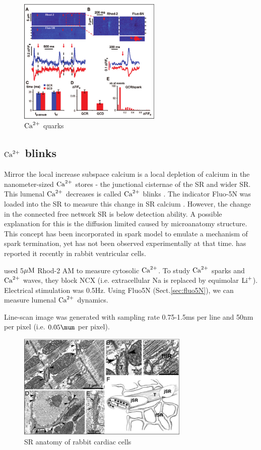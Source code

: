 \begin{figure}[hbt]
  \centerline{\includegraphics[height=6cm,
    angle=0]{./images/quark_brochet11.eps}}
  \caption{${\text{Ca}^{2+}}$ quarks}
\label{fig:quark_brochet11}
\end{figure}


\subsection{${\text{Ca}^{2+}}$ blinks}
\label{sec:calcium_blink}

Mirror the local increase subspace calcium is a local depletion of calcium in
the nanometer-sized ${\text{Ca}^{2+}}$ stores - the junctional cisternae of the SR and wider
SR. This lumenal ${\text{Ca}^{2+}}$ decreases is called ${\text{Ca}^{2+}}$ blinks \citep{brochet2005}.
The indicator Fluo-5N was loaded into the SR to measure this change in SR
calcium \citep{kabbara2001}. However, the change in the connected free network
SR is below detection ability\citep{brochet2011}. A possible explanation for
this is the diffusion limited caused by microanatomy structure. This concept
has been incorporated in spark model to emulate a mechanism of spark termination,
yet has not been observed experimentally at that time. \citep{brochet2011} has
reported it recently in rabbit ventricular cells.

\begin{framed}
\citep{brochet2011} used 5${\mu\text{M}}$ Rhod-2 AM to measure cytosolic ${\text{Ca}^{2+}}$. To study
${\text{Ca}^{2+}}$ sparks and ${\text{Ca}^{2+}}$ waves, they block NCX (i.e. extracellular Na is replaced
by equimolar $\Li$). Electrical stimulation was 0.5Hz.  Using Fluo5N
(Sect.\ref{sec:fluo5N}), we can measure lumenal ${\text{Ca}^{2+}}$ dynamics. 

Line-scan image was generated with sampling rate 0.75-1.5ms per line and 50nm
per pixel (i.e. $0.05\mum$ per pixel).  
\end{framed}

\begin{figure}[hbt]
  \centerline{\includegraphics[height=5cm,
    angle=0]{./images/rabbit_SR_anatomy.eps}}
  \caption{SR anatomy of rabbit cardiac cells\citep{brochet2011}}
\label{fig:SRanatomy_brochet11}
\end{figure}

